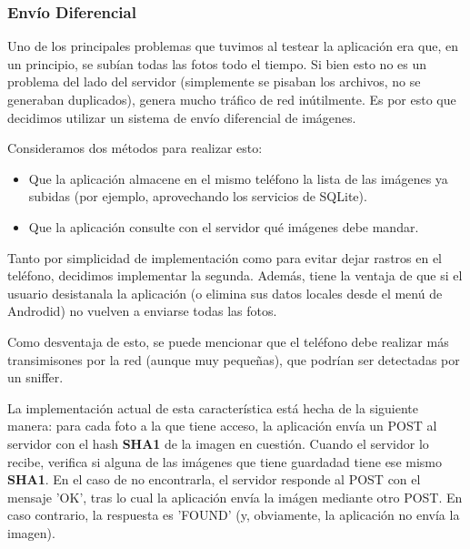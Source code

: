 \documentclass[10pt, a4paper,english,spanish]{article}
\begin{document}

\subsubsection{Envío Diferencial} %
\label{ssub:Envío Diferencial}
Uno de los principales problemas que tuvimos al testear la aplicación era que, en un principio, se subían todas las fotos todo el tiempo. Si bien esto no es un problema del lado del servidor (simplemente se pisaban los archivos, no se generaban duplicados), genera mucho tráfico de red inútilmente. Es por esto que decidimos utilizar un sistema de envío diferencial de imágenes. 

Consideramos dos métodos para realizar esto:
\begin{itemize}
	\item Que la aplicación almacene en el mismo teléfono la lista de las imágenes ya subidas (por ejemplo, aprovechando los servicios de SQLite).
	\item Que la aplicación consulte con el servidor qué imágenes debe mandar. 
\end{itemize}

Tanto por simplicidad de implementación como para evitar dejar rastros en el teléfono, decidimos implementar la segunda. Además, tiene la ventaja de que si el usuario desistanala la aplicación (o elimina sus datos locales desde el menú de Androdid) no vuelven a enviarse todas las fotos. 

Como desventaja de esto, se puede mencionar que el teléfono debe realizar más transimisones por la red (aunque muy pequeñas), que podrían ser detectadas por un sniffer.


La implementación actual de esta característica está hecha de la siguiente manera: para cada foto a la que tiene acceso, la aplicación envía un POST al servidor con el hash \textbf{SHA1} de la imagen en cuestión. Cuando el servidor lo recibe, verifica si alguna de las imágenes que tiene guardadad tiene ese mismo \textbf{SHA1}. En el caso de no encontrarla, el servidor responde al POST con el mensaje 'OK', tras lo cual la aplicación envía la imágen mediante otro POST.
En caso contrario, la respuesta es 'FOUND' (y, obviamente, la aplicación no envía la imagen).


\end{document}
